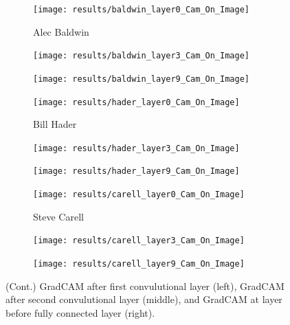 \documentclass{article}
\begin{document}
\begin{figure}
	\ContinuedFloat
	\begin{subfigure}[t]{0.33\linewidth}
		\texttt{[image: results/baldwin\_layer0\_Cam\_On\_Image]}
		\caption{Alec Baldwin}
	\end{subfigure}
	\begin{subfigure}[t]{0.33\linewidth}
		\texttt{[image: results/baldwin\_layer3\_Cam\_On\_Image]}
	\end{subfigure}
	\begin{subfigure}[t]{0.33\linewidth}
		\texttt{[image: results/baldwin\_layer9\_Cam\_On\_Image]}
	\end{subfigure}\vspace{1em}
	\begin{subfigure}[t]{0.33\linewidth}
		\texttt{[image: results/hader\_layer0\_Cam\_On\_Image]}
		\caption{Bill Hader}
	\end{subfigure}
	\begin{subfigure}[t]{0.33\linewidth}
		\texttt{[image: results/hader\_layer3\_Cam\_On\_Image]}
	\end{subfigure}
	\begin{subfigure}[t]{0.33\linewidth}
		\texttt{[image: results/hader\_layer9\_Cam\_On\_Image]}
	\end{subfigure}\vspace{1em}
	\begin{subfigure}[t]{0.33\linewidth}
		\texttt{[image: results/carell\_layer0\_Cam\_On\_Image]}
		\caption{Steve Carell}
	\end{subfigure}
	\begin{subfigure}[t]{0.33\linewidth}
		\texttt{[image: results/carell\_layer3\_Cam\_On\_Image]}
	\end{subfigure}
	\begin{subfigure}[t]{0.33\linewidth}
		\texttt{[image: results/carell\_layer9\_Cam\_On\_Image]}
	\end{subfigure}
	\caption{(Cont.) GradCAM after first convulutional layer (left), GradCAM after second convulutional layer (middle), and GradCAM at layer before fully connected layer (right).}
	\label{fig:gradcam}
\end{figure}
\end{document}
